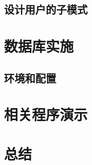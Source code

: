 \documentclass[12pt]{article}
\begin{document}
\subsection{设计用户的子模式}

\section{数据库实施}

\subsection{环境和配置}

\section{相关程序演示}
\section{总结}
\end{document}
